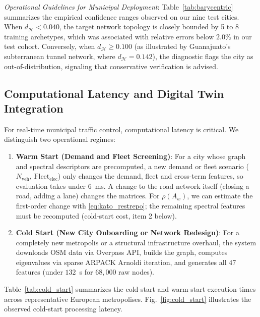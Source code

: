 \documentclass[journal]{IEEEtran}
\begin{document}
\textit{Operational Guidelines for Municipal Deployment}:
Table~\ref{tab:barycentric} summarizes the empirical confidence ranges observed on our nine test cities. When $d_{\mathcal{H}} < 0.040$, the target network topology is closely bounded by 5 to 8 training archetypes, which was associated with relative errors below $2.0\%$ in our test cohort. Conversely, when $d_{\mathcal{H}} \ge 0.100$ (as illustrated by Guanajuato's subterranean tunnel network, where $d_{\mathcal{H}} = 0.142$), the diagnostic flags the city as out-of-distribution, signaling that conservative verification is advised.

\subsection{Computational Latency and Digital Twin Integration}
For real-time municipal traffic control, computational latency is critical. We distinguish two operational regimes:
\begin{enumerate}
    \item \textbf{Warm Start (Demand and Fleet Screening)}: For a city whose graph and spectral descriptors are precomputed, a new demand or fleet scenario ($N_{\text{veh}}$, $\text{Fleet}_{\text{elec}}$) only changes the demand, fleet and cross-term features, so evaluation takes under $6$~ms. A change to the road network itself (closing a road, adding a lane) changes the matrices. For $\rho(A_w)$, we can estimate the first-order change with \eqref{eq:kato_restrepo}; the remaining spectral features must be recomputed (cold-start cost, item 2 below).
    \item \textbf{Cold Start (New City Onboarding or Network Redesign)}: For a completely new metropolis or a structural infrastructure overhaul, the system downloads OSM data via Overpass API, builds the graph, computes eigenvalues via sparse ARPACK Arnoldi iteration, and generates all 47 features (under $132$~s for $68,000$ raw nodes).
\end{enumerate}

Table~\ref{tab:cold_start} summarizes the cold-start and warm-start execution times across representative European metropolises. Fig.~\ref{fig:cold_start} illustrates the observed cold-start processing latency.
\end{document}
